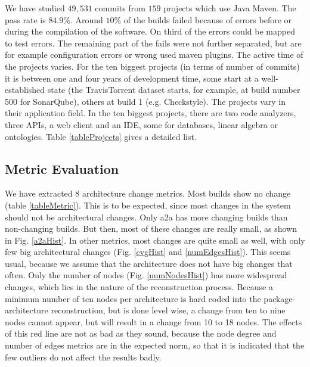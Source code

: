 \documentclass[sigplan, anonymous, review]{acmart}
\begin{document}
We have studied $49,531$ commits from $159$ projects which use Java Maven. The pass rate is $84.9\%$. Around $10\%$ of the builds failed because of errors before or during the compilation of the software. On third of the errors could be mapped to test errors. The remaining part of the fails were not further separated, but are for example configuration errors or wrong used maven plugins.
The active time of the projects varies. For the ten biggest projects (in terms of number of commits) it is between one and four years of development time, some start at a well-established state (the TravisTorrent dataset starts, for example, at build number 500 for SonarQube), others at build 1 (e.g. Checkstyle). The projects vary in their application field. In the ten biggest projects, there are two code analyzers, three APIs, a web client and an IDE, some for databases, linear algebra or ontologies. Table \ref{tableProjects} gives a detailed list.

\subsection{Metric Evaluation}



We have extracted 8 architecture change metrics. Most builds show no change (table \ref{tableMetric}). This is to be expected, since most changes in the system should not be architectural changes. 
Only a2a has more changing builds than non-changing builds. But then, most of these changes are really small, as shown in Fig. \ref{a2aHist}. In other metrics, most changes are quite small as well, with only few big architectural changes (Fig. \ref{cvgHist} and \ref{numEdgesHist}). This seems usual, because we assume that the architecture does not have big changes that often. Only the number of nodes (Fig. \ref{numNodesHist}) has more widespread changes, which lies in the nature of the reconstruction process. Because a minimum number of ten nodes per architecture is hard coded into the package-architecture reconstruction, but is done level wise, a change from ten to nine nodes cannot appear, but will result in a change from 10 to 18 nodes. The effects of this red line are not as bad as they sound, because the node degree and number of edges metrics are in the expected norm, so that it is indicated that the few outliers do not affect the results badly.
\end{document}
